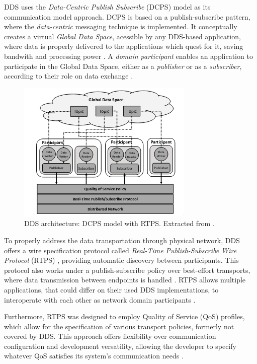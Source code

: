 DDS uses the \textit{Data-Centric Publish Subscribe} (DCPS) model as its communication model approach. DCPS is based on a publish-subscribe pattern, where the \textit{data-centric} messaging technique is implemented. It conceptually creates a virtual \textit{Global Data Space}, acessible by any DDS-based application, where data is properly delivered to the applications which quest for it, saving bandwith and processing power \cite{3, pardo2005introduction}. A \textit{domain participant} enables an application to participate in the Global Data Space, either as a \textit{publisher} or as a \textit{subscriber}, according to their role on data exchange \cite{maruyama2016exploring, alaerjan2017modeling, dcps-rtps}. 

\begin{figure}[H]
    \centering
    \includegraphics[width=0.4\linewidth]{img/dcps-model.png}
    \caption{DDS architecture: DCPS model with RTPS. Extracted from \cite{maruyama2016exploring}.}
    \label{fig:dcps-model}
\end{figure}

To properly address the data transportation through physical network, DDS offers a wire specification protocol called \textit{Real-Time Publish-Subscribe Wire Protocol} (RTPS) \cite{rtps}, providing automatic discovery between participants. This protocol also works under a publish-subscribe policy over best-effort transports, where data transmission between endpoints is handled \cite{yun2017data}. RTPS allows multiple applications, that could differ on their used DDS implementations, to interoperate with each other as network domain participants \cite{dcps-rtps, alaerjan2017modeling}.

Furthermore, RTPS was designed to employ Quality of Service (QoS) profiles, which allow for the specification of various transport policies, formerly not covered by DDS. This approach offers flexibility over communication configuration and development versatility, allowing the developer to specify whatever QoS satisfies its system's communication needs \cite{alaerjan2017modeling, diluoffo2018robot, maruyama2016exploring}. 

